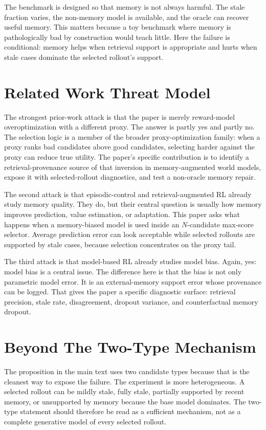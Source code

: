 \documentclass{article}
\begin{document}
The benchmark is designed so that memory is not always harmful. The stale
fraction varies, the non-memory model is available, and the oracle can recover
useful memory. This matters because a toy benchmark where memory is
pathologically bad by construction would teach little. Here the failure is
conditional: memory helps when retrieval support is appropriate and hurts when
stale cases dominate the selected rollout's support.

\section{Related Work Threat Model}
\label{app:related-threat}

The strongest prior-work attack is that the paper is merely reward-model
overoptimization with a different proxy. The answer is partly yes and partly
no. The selection logic is a member of the broader proxy-optimization family:
when a proxy ranks bad candidates above good candidates, selecting harder
against the proxy can reduce true utility. The paper's specific contribution is
to identify a retrieval-provenance source of that inversion in memory-augmented
world models, expose it with selected-rollout diagnostics, and test a
non-oracle memory repair.

The second attack is that episodic-control and retrieval-augmented RL already
study memory quality. They do, but their central question is usually how memory
improves prediction, value estimation, or adaptation. This paper asks what
happens when a memory-biased model is used inside an $N$-candidate max-score
selector. Average prediction error can look acceptable while selected rollouts
are supported by stale cases, because selection concentrates on the proxy tail.

The third attack is that model-based RL already studies model bias. Again,
yes: model bias is a central issue. The difference here is that the bias is not
only parametric model error. It is an external-memory support error whose
provenance can be logged. That gives the paper a specific diagnostic surface:
retrieval precision, stale rate, disagreement, dropout variance, and
counterfactual memory dropout.

\section{Beyond The Two-Type Mechanism}
\label{app:beyond-two-type}

The proposition in the main text uses two candidate types because that is the
cleanest way to expose the failure. The experiment is more heterogeneous. A
selected rollout can be mildly stale, fully stale, partially supported by
recent memory, or unsupported by memory because the base model dominates. The
two-type statement should therefore be read as a sufficient mechanism, not as
a complete generative model of every selected rollout.
\end{document}
